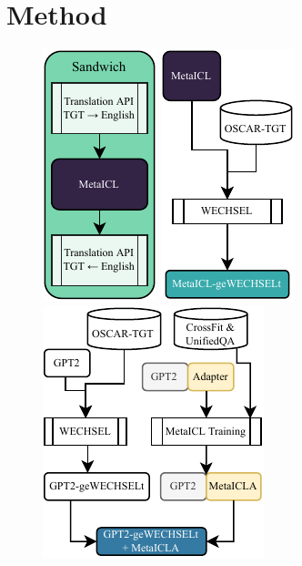 \documentclass[11pt]{article}
\begin{document}
\section{Method}\label{sec:method}
\begin{figure}[ht]
	\subcaptionbox{\label{fig:sandwich}}
	{\includegraphics{sandwich.pdf}}
	\hfill
	\subcaptionbox{\label{fig:metaicl-gewechselt}}
	{\includegraphics{metaicl-gewechselt.pdf}}
	\hfill
	\subcaptionbox{}
	{\includegraphics{gpt2-gewechselt+metaicla.pdf}}

\end{figure}
\end{document}
